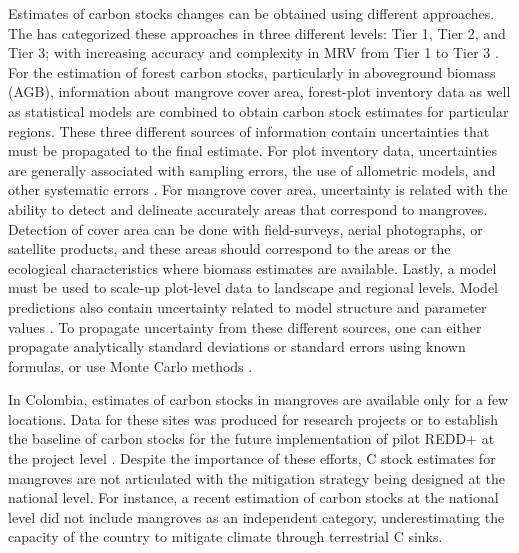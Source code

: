\documentclass[review, authoryear]{elsarticle}   	%
\begin{document}
Estimates of carbon stocks changes can be obtained using different approaches. The \citet{IPCC2003, IPCC2006} has categorized these approaches in three different levels: Tier 1, Tier 2, and Tier 3; with increasing accuracy and complexity in MRV from Tier 1 to Tier 3 \citep{Maniatis2010}. 
For the estimation of forest carbon stocks, particularly in aboveground biomass (AGB), information about mangrove cover area, forest-plot inventory data as well as statistical models are combined to obtain carbon stock estimates for particular regions. These three different sources of information contain uncertainties that must be propagated to the final estimate.  For plot inventory data, uncertainties are generally associated with sampling errors, the use of allometric models, and other systematic errors \citep{Chave2005, Sierra2007}. For mangrove cover area, uncertainty is related with the ability to detect and delineate accurately areas that correspond to mangroves. Detection of cover area can be done with field-surveys, aerial photographs, or satellite products, and these areas should correspond to the areas or the ecological characteristics where biomass estimates are available.  Lastly, a model must be used to scale-up plot-level data to landscape and regional levels. Model predictions also contain uncertainty related to model structure and parameter values \citep{IPCC2006}. To propagate uncertainty from these different sources, one can either propagate analytically standard deviations or standard errors using known formulas, or use Monte Carlo methods \citep{Chave2005, Sierra2007, IPCC2006}.


In Colombia, estimates of carbon stocks in mangroves are available only for a few locations. Data for these sites was produced for research projects or to establish the baseline of carbon stocks for the future implementation of pilot REDD+ at the project level \citep{Bolivar_inpreparation, Malaga2015}. Despite the importance of these efforts, C stock estimates for mangroves are not articulated with the mitigation strategy being designed at the national level. For instance,  a recent estimation of carbon stocks at the national level \citep{Phillips2011} did not include mangroves as an independent category, underestimating the capacity of the country to mitigate climate through terrestrial C sinks.
\end{document}
